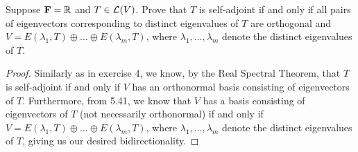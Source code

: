 \begin{exercise}{5}
  Suppose $\mathbf{F}=\mathbb{R}$ and $T\in\mathcal{L}(V)$. Prove that $T$ is self-adjoint if and only if all pairs of eigenvectors corresponding to distinct eigenvalues of $T$ are orthogonal and $V =E(\lambda_1,T)\oplus\dots\oplus E(\lambda_m,T)$, where $\lambda_1,\dots,\lambda_m$ denote the distinct eigenvalues of $T$.
\end{exercise}
\begin{proof}
Similarly as in exercise 4, we know, by the Real Spectral Theorem, that $T$ is self-adjoint if and only if $V$ has an orthonormal basis consisting of eigenvectors of $T$. Furthermore, from 5.41, we know that $V$ has a basis consisting of eigenvectors of $T$ (not necessarily orthonormal) if and only if $V =E(\lambda_1,T)\oplus\dots\oplus E(\lambda_m,T)$, where $\lambda_1,\dots,\lambda_m$ denote the distinct eigenvalues of $T$, giving us our desired bidirectionality.
\end{proof}


